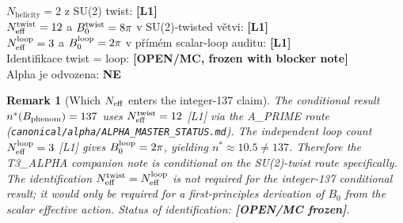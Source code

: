 \documentclass[12pt,a4paper]{article}
\newtheorem{remark}[theorem]{Remark}
\begin{document}
\begin{statusbox}
$N_{\mathrm{helicity}} = 2$ z SU(2) twist: \textbf{[L1]}\\
$N_{\mathrm{eff}}^{\rm twist} = 12$ a $B_0^{\rm twist}=8\pi$ v SU(2)-twisted větvi: \textbf{[L1]}\\
$N_{\mathrm{eff}}^{\rm loop} = 3$ a $B_0^{\rm loop}=2\pi$ v přímém scalar-loop auditu: \textbf{[L1]}\\
Identifikace twist = loop: \textbf{[OPEN/MC, frozen with blocker note]}\\
Alpha je odvozena: \textbf{NE}
\end{statusbox}

\begin{remark}[Which $N_{\rm eff}$ enters the integer-137 claim]
\label{rem:neff_alpha_dependency}
The conditional result $n^*(B_{\rm phenom}) = 137$ uses
$N_{\rm eff}^{\rm twist} = 12$ [L1] via the A\_PRIME route
(\texttt{canonical/alpha/ALPHA\_MASTER\_STATUS.md}).
The independent loop count $N_{\rm eff}^{\rm loop} = 3$ [L1] gives
$B_0^{\rm loop} = 2\pi$, yielding $n^* \approx 10.5 \neq 137$.
Therefore the T3\_ALPHA companion note is conditional on the
SU(2)-twist route specifically. The identification
$N_{\rm eff}^{\rm twist} = N_{\rm eff}^{\rm loop}$ is not required
for the integer-137 conditional result; it would only be required for
a first-principles derivation of $B_0$ from the scalar effective action.
Status of identification: \textbf{[OPEN/MC frozen]}.
\end{remark}
\end{document}
